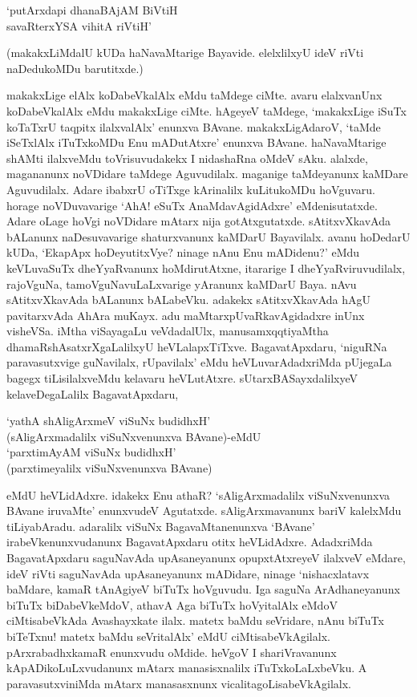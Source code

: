 \begin{shloka}
`putArxdapi dhanaBAjAM BiVtiH\\
savaRterxYSA vihitA riVtiH'
\end{shloka}

(makakxLiMdalU kUDa haNavaMtarige Bayavide. elelxlilxyU ideV riVti naDedukoMDu barutitxde.)

makakxLige elAlx koDabeVkalAlx eMdu taMdege ciMte. avaru elalxvanUnx koDabeVkalAlx eMdu makakxLige ciMte. hAgeyeV taMdege, `makakxLige iSuTx koTaTxrU taqpitx ilalxvalAlx' enunxva BAvane. makakxLigAdaroV, `taMde iSeTxlAlx iTuTxkoMDu Enu mADutAtxre' enunxva BAvane. haNavaMtarige shAMti ilalxveMdu toVrisuvudakekx I nidashaRna oMdeV sAku. alalxde, magananunx noVDidare taMdege Aguvudilalx. maganige taMdeyanunx kaMDare Aguvudilalx. Adare ibabxrU oTiTxge kArinalilx kuLitukoMDu hoVguvaru. horage noVDuvavarige `AhA! eSuTx AnaMdavAgidAdxre' eMdenisutatxde. Adare oLage hoVgi noVDidare mAtarx nija gotAtxgutatxde. sAtitxvXkavAda bALanunx naDesuvavarige shaturxvanunx kaMDarU Bayavilalx. avanu hoDedarU kUDa, `EkapApx hoDeyutitxVye? ninage nAnu Enu mADidenu?' eMdu keVLuvaSuTx dheYyaRvanunx hoMdirutAtxne, itararige I dheYyaRviruvudilalx, rajoVguNa, tamoVguNavuLaLxvarige yAranunx kaMDarU Baya. nAvu sAtitxvXkavAda bALanunx bALabeVku. adakekx sAtitxvXkavAda hAgU pavitarxvAda AhAra muKayx. adu maMtarxpUvaRkavAgidadxre inUnx visheVSa. iMtha viSayagaLu veVdadalUlx, manusamxqqtiyaMtha dhamaRshAsatxrXgaLalilxyU heVLalapxTiTxve. BagavatApxdaru, `niguRNa paravasutxvige guNavilalx, rUpavilalx' eMdu heVLuvarAdadxriMda pUjegaLa bagegx tiLisilalxveMdu kelavaru heVLutAtxre. sUtarxBASayxdalilxyeV kelaveDegaLalilx BagavatApxdaru,

\begin{shloka}
`yathA shAligArxmeV viSuNx budidhxH'\\
(sAligArxmadalilx viSuNxvenunxva BAvane)-eMdU\\
`parxtimAyAM viSuNx budidhxH'\\
(parxtimeyalilx viSuNxvenunxva BAvane)
\end{shloka}

\noindent eMdU heVLidAdxre. idakekx Enu athaR? `sAligArxmadalilx viSuNxvenunxva BAvane iruvaMte' enunxvudeV Agutatxde. sAligArxmavanunx bariV kalelxMdu tiLiyabAradu. adaralilx viSuNx BagavaMtanenunxva `BAvane' irabeVkenunxvudanunx BagavatApxdaru otitx heVLidAdxre. AdadxriMda BagavatApxdaru saguNavAda upAsaneyanunx opupxtAtxreyeV ilalxveV eMdare, ideV riVti saguNavAda upAsaneyanunx mADidare, ninage `nishacxlatavx baMdare, kamaR tAnAgiyeV biTuTx hoVguvudu. Iga saguNa ArAdhaneyanunx biTuTx biDabeVkeMdoV, athavA Aga biTuTx hoVyitalAlx eMdoV ciMtisabeVkAda Avashayxkate ilalx. matetx baMdu seVridare, nAnu biTuTx biTeTxnu! matetx baMdu seVritalAlx' eMdU ciMtisabeVkAgilalx. pArxrabadhxkamaR enunxvudu oMdide. heVgoV I shariVravanunx kApADikoLuLxvudanunx mAtarx manasisxnalilx iTuTxkoLaLxbeVku. A paravasutxviniMda mAtarx manasasxnunx vicalitagoLisabeVkAgilalx.

